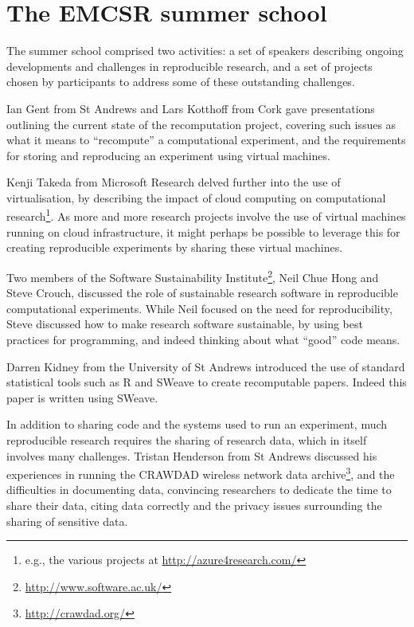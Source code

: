 \section{The EMCSR summer school}
\label{s:school}

The summer school comprised two activities: a set of speakers
describing ongoing developments and challenges in reproducible
research, and a set of projects chosen by participants to address some
of these outstanding challenges.

Ian Gent from St Andrews and Lars Kotthoff from Cork gave
presentations outlining the current state of the recomputation
project, covering such issues as what it means to ``recompute'' a
computational experiment, and the requirements for storing and
reproducing an experiment using virtual machines.

Kenji Takeda from Microsoft Research delved further into the use of
virtualisation, by describing the impact of cloud computing on
computational research\footnote{e.g., the various projects at
\url{http://azure4research.com/}}. As more and more research projects
involve the use of virtual machines running on cloud infrastructure,
it might perhaps be possible to leverage this for creating
reproducible experiments by sharing these virtual machines.

Two members of the Software Sustainability
Institute\footnote{\url{http://www.software.ac.uk/}}, Neil Chue Hong
and Steve Crouch, discussed the role of sustainable research software
in reproducible computational experiments. While Neil focused on the
need for reproducibility, Steve discussed how to make research
software sustainable, by using best practices for programming, and
indeed thinking about what ``good'' code means.

Darren Kidney from the University of St Andrews introduced the use of
standard statistical tools such as R and SWeave to create recomputable
papers. Indeed this paper is written using SWeave.

In addition to sharing code and the systems used to run an experiment,
much reproducible research requires the sharing of research data,
which in itself involves many challenges. Tristan Henderson from St
Andrews discussed his experiences in running the CRAWDAD wireless
network data archive\footnote{\url{http://crawdad.org/}}, and the
difficulties in documenting data, convincing researchers to dedicate
the time to share their data, citing data correctly and the privacy
issues surrounding the sharing of sensitive data.

